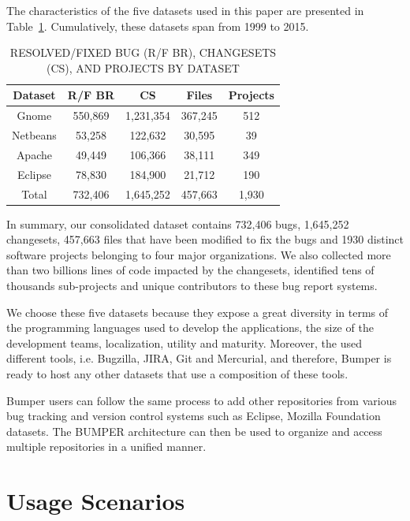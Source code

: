 \documentclass[conference]{IEEEtran}
\begin{document}
The characteristics of the five datasets used in this paper are presented in Table~\ref{tab:summary}.
Cumulatively, these datasets span from 1999 to 2015.

\begin{table}[]
\centering
\caption{
RESOLVED/FIXED BUG (R/F BR),  CHANGESETS (CS), AND
PROJECTS BY DATASET}
\label{tab:summary}
\begin{tabular}{c|c|c|c|c}
\textbf{Dataset} & \textbf{R/F BR} & \textbf{CS} & \textbf{Files} & \textbf{Projects} \\ \hline \hline
Gnome            & 550,869         & 1,231,354   & 367,245        & 512                \\ \hline
Netbeans         & 53,258          & 122,632     & 30,595         & 39                \\ \hline
Apache           & 49,449          & 106,366     & 38,111         & 349               \\ \hline
Eclipse          & 78,830          & 184,900     & 21,712         & 190                \\ \hline \hline
Total            & 732,406         & 1,645,252   & 457,663        & 1,930               \\ \hline \hline
\end{tabular}
\end{table}

In summary, our consolidated dataset contains 732,406 bugs, 1,645,252 changesets, 457,663 files that have been modified to fix the bugs and 1930 distinct software projects belonging to four major organizations.
We also collected more than two billions lines of code impacted by the changesets, identified tens of thousands sub-projects and unique contributors to these bug report systems.

We choose these five datasets because they expose a great diversity in terms of the programming languages used to develop the applications, the size of the development teams, localization, utility and maturity.
Moreover, the used different tools, i.e.
Bugzilla, JIRA, Git and Mercurial, and therefore, Bumper is ready to host any other datasets that use a composition of these tools.

Bumper users can follow the same process to add other repositories from various bug tracking and version control
systems such as Eclipse, Mozilla Foundation datasets. The BUMPER architecture can then be used to organize and
access multiple repositories in a unified manner.


\section{Usage Scenarios}
\end{document}
